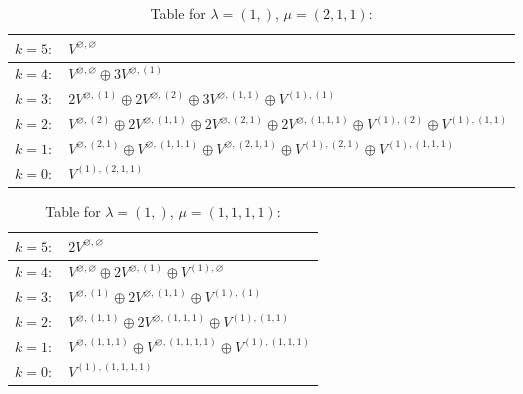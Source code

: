 \documentclass[a4paper,12pt]{article}
\begin{document}
\renewcommand{\arraystretch}{1.6} 
\begin{table}[H]
\centering
\caption{Table for $\lambda = (1,)$, $\mu = (2, 1, 1)$:}
\begin{tabular}{|>{\centering\arraybackslash}p{15cm}|}
\hline
 $k = 5: \quad V^{\varnothing, \varnothing} $ \\ \hline
 $k = 4: \quad V^{\varnothing, \varnothing} \oplus 3 V^{\varnothing, (1)} $ \\ \hline
 $k = 3: \quad 2 V^{\varnothing, (1)} \oplus 2 V^{\varnothing, (2)} \oplus 3 V^{\varnothing, (1, 1)} \oplus V^{(1), (1)} $ \\ \hline
 $k = 2: \quad V^{\varnothing, (2)} \oplus 2 V^{\varnothing, (1, 1)} \oplus 2 V^{\varnothing, (2, 1)} \oplus 2 V^{\varnothing, (1, 1, 1)} \oplus V^{(1), (2)} \oplus V^{(1), (1, 1)} $ \\ \hline
 $k = 1: \quad V^{\varnothing, (2, 1)} \oplus V^{\varnothing, (1, 1, 1)} \oplus V^{\varnothing, (2, 1, 1)} \oplus V^{(1), (2, 1)} \oplus V^{(1), (1, 1, 1)} $ \\ \hline
 $k = 0: \quad V^{(1), (2, 1, 1)} $ \\ \hline
\end{tabular}
\end{table}

\renewcommand{\arraystretch}{1.6} 
\begin{table}[H]
\centering
\caption{Table for $\lambda = (1,)$, $\mu = (1, 1, 1, 1)$:}
\begin{tabular}{|>{\centering\arraybackslash}p{15cm}|}
\hline
 $k = 5: \quad 2 V^{\varnothing, \varnothing} $ \\ \hline
 $k = 4: \quad V^{\varnothing, \varnothing} \oplus 2 V^{\varnothing, (1)} \oplus V^{(1), \varnothing} $ \\ \hline
 $k = 3: \quad V^{\varnothing, (1)} \oplus 2 V^{\varnothing, (1, 1)} \oplus V^{(1), (1)} $ \\ \hline
 $k = 2: \quad V^{\varnothing, (1, 1)} \oplus 2 V^{\varnothing, (1, 1, 1)} \oplus V^{(1), (1, 1)} $ \\ \hline
 $k = 1: \quad V^{\varnothing, (1, 1, 1)} \oplus V^{\varnothing, (1, 1, 1, 1)} \oplus V^{(1), (1, 1, 1)} $ \\ \hline
 $k = 0: \quad V^{(1), (1, 1, 1, 1)} $ \\ \hline
\end{tabular}
\end{table}
\end{document}

